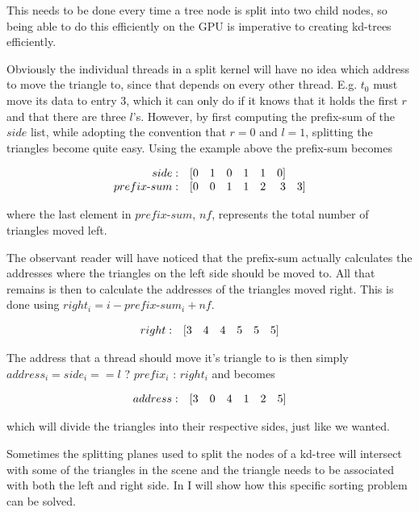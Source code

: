 This needs to be done every time a tree node is split into two child nodes, so
being able to do this efficiently on the GPU is imperative to creating kd-trees
efficiently.

Obviously the individual threads in a split kernel will have no idea which
address to move the triangle to, since that depends on every other
thread. E.g. $t_0$ must move its data to entry 3, which it can only do if it
knows that it holds the first $r$ and that there are three $l$'s. However, by
first computing the prefix-sum of the $side$ list, while adopting the convention
that $r = 0$ and $l = 1$, splitting the triangles become quite easy. Using the
example above the prefix-sum becomes

\begin{displaymath}
  \begin{array} {r r r r r r r r}
    side: & [0 & 1 & 0 & 1 & 1 & 0]\\
    prefix\text{-}sum: & [0 & 0 & 1 & 1 & 2 & 3 & 3]
  \end{array}
\end{displaymath}

where the last element in $prefix\text{-}sum$, $nf$, represents the total number
of triangles moved left.

The observant reader will have noticed that the prefix-sum actually calculates
the addresses where the triangles on the left side should be moved to. All that
remains is then to calculate the addresses of the triangles moved right. This is
done using $right_i = i - prefix\text{-}sum_i + nf$.

\begin{displaymath}
  \begin{array} {r r r r r r r}
    right: & [3 & 4 & 4 & 5 & 5 & 5]
  \end{array}
\end{displaymath}

The address that a thread should move it's triangle to is then simply
$address_i = side_i == l$ ? $prefix_i$ : $right_i$ and becomes


\begin{displaymath}
  \begin{array} {r r r r r r r}
    address: & [3 & 0 & 4 & 1 & 2 & 5]
  \end{array}
\end{displaymath}

which will divide the triangles into their respective sides, just like
we wanted.

Sometimes the splitting planes used to split the nodes of a kd-tree will
intersect with some of the triangles in the scene and the triangle needs to be
associated with both the left and right side. In  I
will show how this specific sorting problem can be solved.


